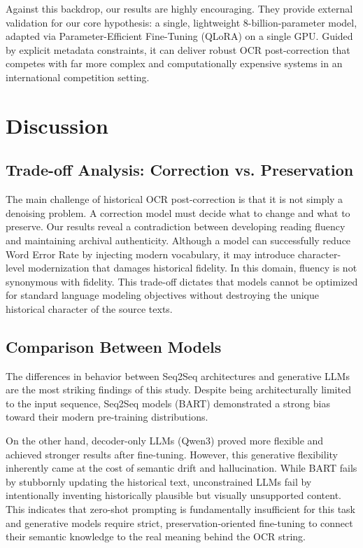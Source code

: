 \documentclass[11pt]{extarticle}
\begin{document}
Against this backdrop, our results are highly encouraging. They provide external validation for our core hypothesis: a single, lightweight 8-billion-parameter model, adapted via Parameter-Efficient Fine-Tuning (QLoRA) on a single GPU. Guided by explicit metadata constraints, it can deliver robust OCR post-correction that competes with far more complex and computationally expensive systems in an international competition setting.

\section{Discussion}

\subsection{Trade-off Analysis: Correction vs. Preservation}
The main challenge of historical OCR post-correction is that it is not simply a denoising problem. A correction model must decide what to change and what to preserve. Our results reveal a contradiction between developing reading fluency and maintaining archival authenticity. Although a model can successfully reduce Word Error Rate by injecting modern vocabulary, it may introduce character-level modernization that damages historical fidelity. In this domain, fluency is not synonymous with fidelity. This trade-off dictates that models cannot be optimized for standard language modeling objectives without destroying the unique historical character of the source texts.

\subsection{Comparison Between Models}
The differences in behavior between Seq2Seq architectures and generative LLMs are the most striking findings of this study. Despite being architecturally limited to the input sequence, Seq2Seq models (BART) demonstrated a strong bias toward their modern pre-training distributions.  

On the other hand, decoder-only LLMs (Qwen3) proved more flexible and achieved stronger results after fine-tuning. However, this generative flexibility inherently came at the cost of semantic drift and hallucination. While BART fails by stubbornly updating the historical text, unconstrained LLMs fail by intentionally inventing historically plausible but visually unsupported content. This indicates that zero-shot prompting is fundamentally insufficient for this task and generative models require strict, preservation-oriented fine-tuning to connect their semantic knowledge to the real meaning behind the OCR string.
\end{document}
